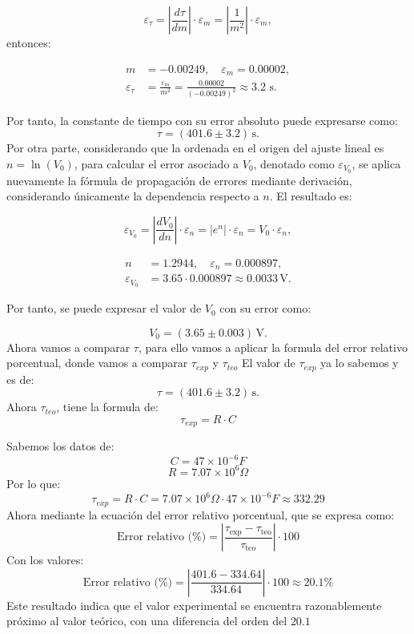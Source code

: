\documentclass{article}
\begin{document}
\[
\varepsilon_\tau = \left| \frac{d\tau}{dm} \right| \cdot \varepsilon_m = \left| \frac{1}{m^2} \right| \cdot \varepsilon_m,
\]
entonces:
\vspace{0.3cm}


\begin{align*}
	m &= -0.00249, \quad \varepsilon_m = 0.00002, \\
	\varepsilon_\tau &= \frac{\varepsilon_m}{m^2} = \frac{0.00002}{(-0.00249)^2} \approx 3.2 \text{ s}.
\end{align*}

Por tanto, la constante de tiempo con su error absoluto puede expresarse como:
\[
\tau = (401.6 \pm 3.2) \, \text{s}.
\]
Por otra parte, considerando que la ordenada en el origen del ajuste lineal es \( n = \ln(V_0) \), para calcular el error asociado a \( V_0 \), denotado como \( \varepsilon_{V_0} \), se aplica nuevamente la fórmula de propagación de errores mediante derivación, considerando únicamente la dependencia respecto a \( n \). El resultado es:

\[
\varepsilon_{V_0} = \left| \frac{dV_0}{dn} \right| \cdot \varepsilon_n = \left| e^n \right| \cdot \varepsilon_n = V_0 \cdot \varepsilon_n,
\]


\vspace{0.3cm}



\begin{align*}
	n &= 1.2944, \quad \varepsilon_n = 0.000897, \\
	\varepsilon_{V_0} &= 3.65 \cdot 0.000897 \approx 0.0033 \, \text{V}.
\end{align*}

Por tanto, se puede expresar el valor de \( V_0 \) con su error como:

\[
V_0 = (3.65 \pm 0.003) \, \text{V}.
\]
Ahora vamos a comparar $\tau$, para ello vamos a aplicar la formula del error relativo porcentual, donde vamos a comparar $\tau_{exp}$ y $\tau_{teo}$
\vspace{2em}
El valor de $\tau_{exp}$ ya lo sabemos y es de:
\[
\tau = (401.6 \pm 3.2) \, \text{s}.
\]
Ahora $\tau_{teo}$, tiene la formula de:
\[
\tau_{exp} = R \cdot C
\] 


Sabemos los datos de:
\[
C = 47\times10^{-6} F
\]
\[
R = 7.07\times10^{6}\varOmega
\]
Por lo que:
\[
\tau_{exp} = R \cdot C = 7.07\times10^{6}\varOmega \cdot 47\times10^{-6} F \approx 332.29
\] 
Ahora mediante la ecuación del error relativo porcentual, que se expresa como:
\[
\text{Error relativo (\%)} = \left| \frac{\tau_{\text{exp}} - \tau_{\text{teo}}}{\tau_{\text{teo}}} \right| \cdot 100
\]
Con los valores:
\[
\text{Error relativo (\%)} = \left| \frac{401.6 - 334.64}{334.64} \right| \cdot 100 \approx 20.1\%
\]
Este resultado indica que el valor experimental se encuentra razonablemente próximo al valor teórico, con una diferencia del orden del $20.1$
\end{document}
